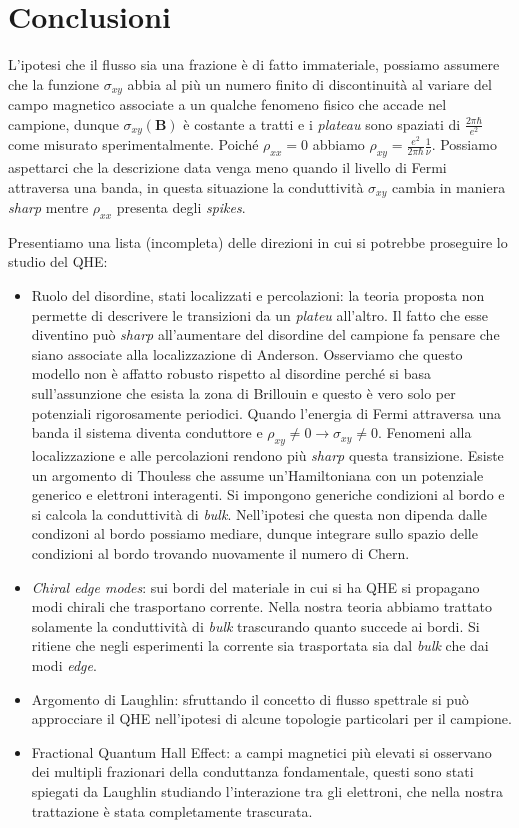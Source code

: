 \documentclass[12pt,a4paper]{article}
\begin{document}
\section{Conclusioni}
L'ipotesi che il flusso sia una frazione è di fatto immateriale, possiamo assumere che la funzione $\sigma_{xy}$ abbia al più un numero finito di discontinuità al variare del campo magnetico associate a un qualche fenomeno fisico che accade nel campione, dunque $\sigma_{xy}(\mathbf{B})$ è costante a tratti e i \emph{plateau} sono spaziati di $\frac{2 \pi \hbar}{e^2}$ come misurato sperimentalmente. Poiché $\rho_{xx} = 0$ abbiamo $\rho_{xy} = \frac{e^2}{2 \pi \hbar} \frac{1}{\nu}$.  Possiamo aspettarci che la descrizione data venga meno quando il livello di Fermi attraversa una banda, in questa situazione la conduttività $\sigma_{xy}$ cambia in maniera \emph{sharp} mentre $\rho_{xx}$ presenta degli \emph{spikes}.  

Presentiamo una lista (incompleta) delle direzioni in cui si potrebbe proseguire lo studio del QHE:

\begin{itemize}
\item Ruolo del disordine, stati localizzati e percolazioni: la teoria proposta non permette di descrivere le transizioni da un \emph{plateu} all'altro. Il fatto che esse diventino può \emph{sharp} all'aumentare del disordine del campione fa pensare che siano associate alla localizzazione di Anderson. Osserviamo che questo modello non è affatto robusto rispetto al disordine perché si basa sull'assunzione che esista la zona di Brillouin e questo è vero solo per potenziali rigorosamente  periodici. Quando l'energia di Fermi attraversa una banda il sistema diventa conduttore e $\rho_{xy} \neq 0 \rightarrow \sigma_{xy} \neq 0$. Fenomeni alla localizzazione e alle percolazioni rendono più \emph{sharp} questa transizione.
Esiste un argomento di Thouless che assume un'Hamiltoniana con un potenziale generico e elettroni interagenti. Si impongono generiche condizioni al bordo e si calcola la conduttività di \emph{bulk}. Nell'ipotesi che questa non dipenda dalle condizoni al bordo possiamo mediare, dunque integrare sullo spazio delle condizioni al bordo trovando nuovamente il numero di Chern.
\item \emph{Chiral edge modes}: sui bordi del materiale in cui si ha QHE si propagano modi chirali che trasportano corrente. Nella nostra teoria abbiamo trattato solamente la conduttività di \emph{bulk} trascurando quanto succede ai bordi. Si ritiene che negli esperimenti la corrente sia trasportata sia dal \emph{bulk} che dai modi \emph{edge}.
\item Argomento di Laughlin: sfruttando il concetto di flusso spettrale si può approcciare il QHE nell'ipotesi di alcune topologie particolari per il campione. 
\item Fractional Quantum Hall Effect: a campi magnetici più elevati si osservano dei multipli frazionari della conduttanza fondamentale, questi sono stati spiegati da Laughlin studiando l'interazione tra gli elettroni, che nella nostra trattazione è stata completamente trascurata.

\end{itemize}
\end{document}
